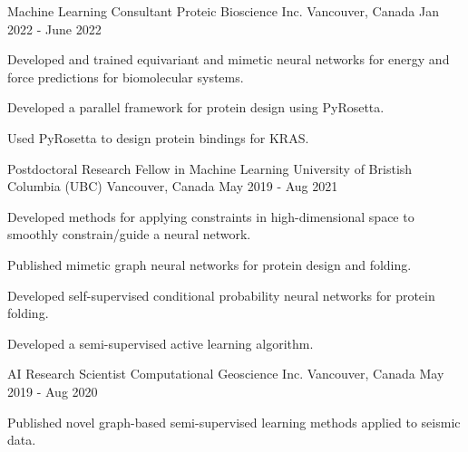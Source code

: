 

\begin{cventries}

  \cventry
    {Machine Learning Consultant} %
    {Proteic Bioscience Inc.} %
    {Vancouver, Canada} %
    {Jan 2022 - June 2022} %
    {
      \begin{cvitems} %
        \item {Developed and trained equivariant and mimetic neural networks for energy and force predictions for biomolecular systems.}
        \item {Developed a parallel framework for protein design using PyRosetta.}
        \item {Used PyRosetta to design protein bindings for KRAS.}
      \end{cvitems}
    }

  \cventry
    {Postdoctoral Research Fellow in Machine Learning} %
    {University of Bristish Columbia (UBC)} %
    {Vancouver, Canada} %
    {May 2019 - Aug 2021} %
    {
      \begin{cvitems} %
        \item {Developed methods for applying constraints in high-dimensional space to smoothly constrain/guide a neural network.}
        \item {Published mimetic graph neural networks for protein design and folding.}
        \item {Developed self-supervised conditional probability neural networks for protein folding.}
        \item {Developed a semi-supervised active learning algorithm.}
      \end{cvitems}
    }

  \cventry
    {AI Research Scientist} %
    {Computational Geoscience Inc.} %
    {Vancouver, Canada} %
    {May 2019 - Aug 2020} %
    {
      \begin{cvitems} %
        \item {Published novel graph-based semi-supervised learning methods applied to seismic data.}
      \end{cvitems}
    }


\end{cventries}
